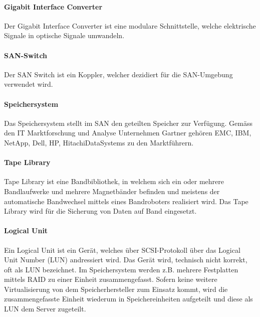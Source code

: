 \paragraph*{Gigabit Interface Converter}
Der Gigabit Interface Converter ist eine modulare Schnittstelle, welche elektrische Signale in optische Signale umwandeln. \cite{SNIA2011}

\paragraph*{SAN-Switch}
Der SAN Switch ist ein Koppler, welcher dezidiert für die SAN-Umgebung verwendet wird.

\paragraph*{Speichersystem}
Das Speichersystem stellt im SAN den geteilten Speicher zur Verfügung. Gemäss den IT Marktforschung und Analyse Unternehmen Gartner gehören \gls{EMC}, \gls{IBM}, NetApp, \gls{Dell}, \gls{HP}, \gls{HitachiDataSystems} zu den Marktführern. \cite{RogerW.CoxPushanRinnenStanleyZaffos2011}

\paragraph*{Tape Library}
Tape Library ist eine Bandbibliothek, in welchem sich ein oder mehrere Bandlaufwerke und mehrere Magnetbänder befinden und meistens der automatische Bandwechsel mittels eines Bandroboters realisiert wird. Das Tape Library wird für die Sicherung von Daten auf Band eingesetzt.

\paragraph*{Logical Unit}
Ein Logical Unit ist ein Gerät, welches über SCSI-Protokoll über das Logical Unit Number (LUN) andressiert wird. Das Gerät wird, technisch nicht korrekt, oft als LUN bezeichnet. Im Speichersystem werden z.B. mehrere Festplatten mittels RAID zu einer Einheit zusammengefasst. Sofern keine weitere Virtualisierung von dem Speicherhersteller zum Einsatz kommt, wird die zusammengefasste Einheit wiederum in Speichereinheiten aufgeteilt und diese als LUN dem Server zugeteilt. \cite{SNIA2011}

